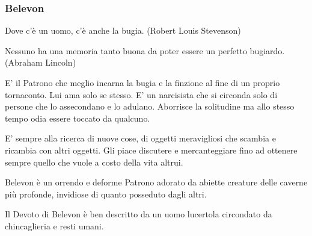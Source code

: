 \begin{multicols}{2}
\subsubsection{Belevon}\label{belevon}\hypertarget{belevon}{}

\begin{enfasi}{
Dove c'è un uomo, c'è anche la bugia. (Robert Louis Stevenson)

\medskip

Nessuno ha una memoria tanto buona da poter essere un perfetto bugiardo. (Abraham Lincoln)
}\end{enfasi}

E' il Patrono che meglio incarna la bugia e la finzione al fine di un proprio tornaconto. Lui ama solo se stesso. E' un narcisista che si circonda solo di persone che lo assecondano e lo adulano. Aborrisce la solitudine ma allo stesso tempo odia essere toccato da qualcuno.

E' sempre alla ricerca di nuove cose, di oggetti meravigliosi che scambia e ricambia con altri oggetti. Gli piace discutere e mercanteggiare fino ad ottenere sempre quello che vuole a costo della vita altrui.

Belevon è un orrendo e deforme Patrono adorato da abiette creature delle caverne più profonde, invidiose di quanto posseduto dagli altri.

Il Devoto di Belevon è ben descritto da un uomo lucertola circondato da chincaglieria e resti umani.


\end{multicols}

